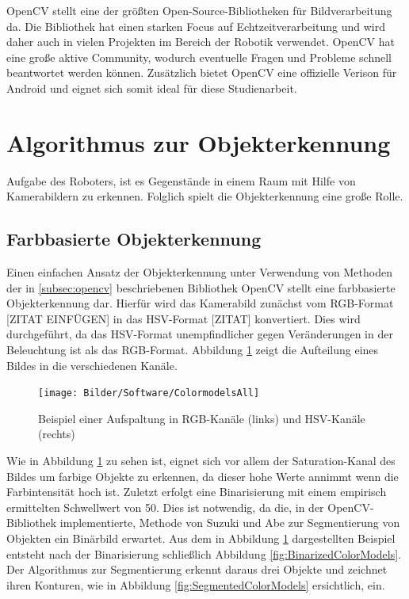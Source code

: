 OpenCV \cite{opencv_library, bradski2008learning} stellt eine der größten Open-Source-Bibliotheken für Bildverarbeitung da. Die Bibliothek hat einen starken Focus auf Echtzeitverarbeitung und wird daher auch in vielen Projekten im Bereich der Robotik verwendet. OpenCV hat eine große aktive Community, wodurch eventuelle Fragen und Probleme schnell beantwortet werden können. Zusätzlich bietet OpenCV eine offizielle Verison für Android und eignet sich somit ideal für diese Studienarbeit.


\section{Algorithmus zur Objekterkennung}

Aufgabe des Roboters, ist es Gegenstände in einem Raum mit Hilfe von Kamerabildern zu erkennen. Folglich spielt die Objekterkennung eine große Rolle.

\subsection{Farbbasierte Objekterkennung}
Einen einfachen Ansatz der Objekterkennung unter Verwendung von Methoden der in \ref{subsec:opencv} beschriebenen Bibliothek OpenCV stellt eine farbbasierte Objekterkennung dar. Hierfür wird das Kamerabild zunächst vom RGB-Format [ZITAT EINFÜGEN] in das HSV-Format [ZITAT] konvertiert. Dies wird durchgeführt, da das HSV-Format unempfindlicher gegen Veränderungen in der Beleuchtung ist als das RGB-Format. Abbildung \ref{fig:ColorModels} zeigt die Aufteilung eines Bildes in die verschiedenen Kanäle.

\begin{figure}[h]
\centering
\texttt{[image: Bilder/Software/ColormodelsAll]}
\caption{Beispiel einer Aufspaltung in RGB-Kanäle (links) und HSV-Kanäle (rechts)}
\label{fig:ColorModels}
\end{figure}

Wie in Abbildung \ref{fig:ColorModels} zu sehen ist, eignet sich vor allem der Saturation-Kanal des Bildes um farbige Objekte zu erkennen, da dieser hohe Werte annimmt wenn die Farbintensität hoch ist. Zuletzt erfolgt eine Binarisierung mit einem empirisch ermittelten Schwellwert von 50. Dies ist notwendig, da die, in der OpenCV-Bibliothek implementierte, Methode von Suzuki und Abe \cite{suzuki1985topological} zur Segmentierung von Objekten ein Binärbild erwartet. Aus dem in Abbildung \ref{fig:ColorModels} dargestellten Beispiel entsteht nach der Binarisierung schließlich Abbildung \ref{fig:BinarizedColorModels}. Der Algorithmus zur Segmentierung erkennt daraus drei Objekte und zeichnet ihren Konturen, wie in Abbildung \ref{fig:SegmentedColorModels} ersichtlich, ein.

